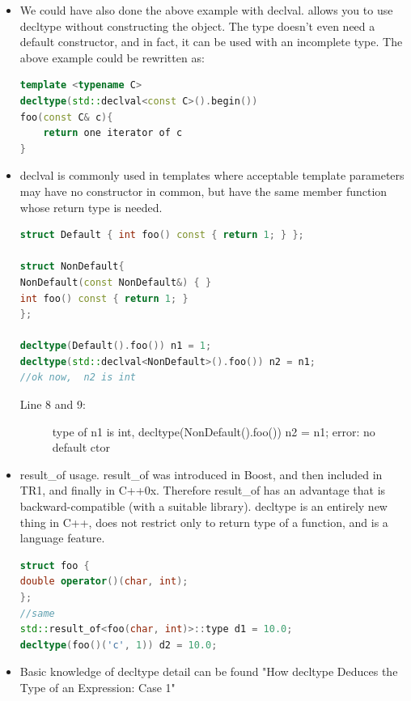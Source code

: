 \documentclass[a4paper,11pt,twoside]{book}
\begin{document}
\begin{itemize}
	\item We could have also done the above example with declval. allows you to use decltype without constructing the object. The type doesn't even need a default constructor, and in fact, it can be used with an incomplete type. The above example could be rewritten as:
	
\begin{lstlisting}[frame=single, language=c++, mathescape=true]
template <typename C>
decltype(std::declval<const C>().begin())
foo(const C& c){
	return one iterator of c
}
\end{lstlisting}
	
	\item declval is commonly used in templates where acceptable template parameters may have no constructor in common, but have the same member function whose return type is needed.
	
\begin{lstlisting}[frame=single, language=c++]
struct Default { int foo() const { return 1; } };

struct NonDefault{
NonDefault(const NonDefault&) { }
int foo() const { return 1; }
};
	
decltype(Default().foo()) n1 = 1;   
decltype(std::declval<NonDefault>().foo()) n2 = n1;
//ok now,  n2 is int
\end{lstlisting}
\begin{description}
	\item[Line 8 and 9:]  type of n1 is int, decltype(NonDefault().foo()) n2 = n1;  error: no default ctor
\end{description}
	
	\item result\_of usage. result\_of was introduced in Boost, and then included in TR1, and finally in C++0x. Therefore result\_of has an advantage that is backward-compatible (with a suitable library). decltype is an entirely new thing in C++, does not restrict only to return type of a function, and is a language feature.
\begin{lstlisting}[frame=single, language=c++]
struct foo {
double operator()(char, int);
};
//same
std::result_of<foo(char, int)>::type d1 = 10.0;
decltype(foo()('c', 1)) d2 = 10.0;
\end{lstlisting}

\item Basic knowledge of decltype detail can be found "How decltype Deduces the Type of an Expression: Case 1"
\end{itemize}
\end{document}
